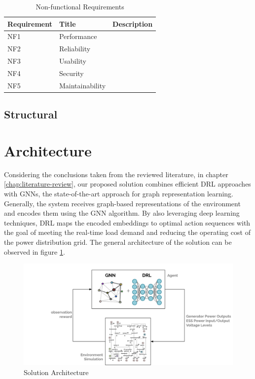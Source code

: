 \begin{table}[h!]
	\centering
	\caption{Non-functional Requirements}
	\begin{tabular}{|P{2cm}|P{4cm}|p{6cm}|  }
		\hline
		\textbf{Requirement} & \textbf{Title} & \textbf{Description} \\
		\hline
		NF1 & Performance & \\
		\hline
		NF2 & Reliability & \\
		\hline
		NF3 & Usability & \\
		\hline
		NF4 & Security & \\
		\hline
		NF5 & Maintainability & \\
		\hline
		
		\hline
	\end{tabular}
\end{table}

\subsection{Structural}

\section{Architecture} \label{sec:arch}

Considering the conclusions taken from the reviewed literature, in chapter \ref{chap:literature-review}, our proposed solution combines efficient \acf{DRL} approaches with \acfp{GNN}, the state-of-the-art approach for graph representation learning. Generally, the system receives graph-based representations of the environment and encodes them using the \ac{GNN} algorithm. By also leveraging deep learning techniques, \ac{DRL} maps the encoded embeddings to optimal action sequences with the goal of meeting the real-time load demand and reducing the operating cost of the power distribution grid. The general architecture of the solution can be observed in figure \ref{fig:arch}.

\begin{figure}
	\centering
	\includegraphics[width=0.85\linewidth]{./figures/arch.png}
	\caption{Solution Architecture}
	\label{fig:arch}
\end{figure}



